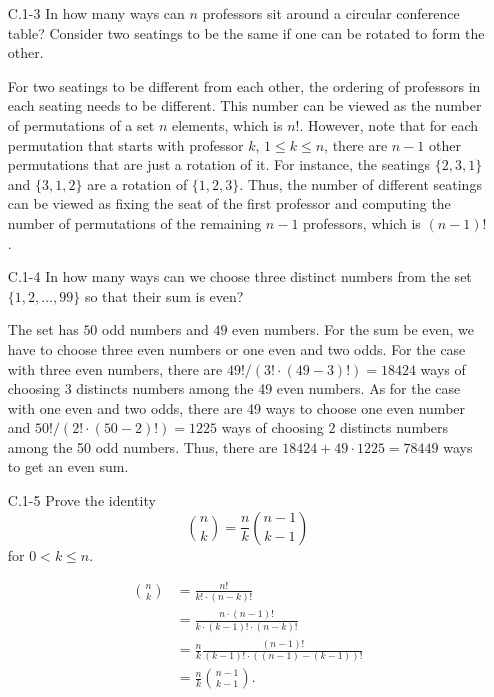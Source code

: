 \documentclass{report}
\makeatletter
\renewenvironment{framed}{%
 \def\FrameCommand##1{\hskip\@totalleftmargin
 \fboxsep=\FrameSep\fbox{##1}}%
 \MakeFramed {\advance\hsize-\width
   \@totalleftmargin\z@ \linewidth\hsize
   \@setminipage}}%
 {\par\unskip\endMakeFramed}
\makeatother
\begin{document}
\begin{enumerate}
\item[C.1{-}3] {In how many ways can $n$ professors sit around a circular
conference table? Consider two seatings to be the same if one can be rotated to
form the other.}

\begin{framed}
For two seatings to be different from each other, the ordering of professors in
each seating needs to be different. This number can be viewed as the number
of permutations of a set $n$ elements, which is $n!$. However, note that for
each permutation that starts with professor $k$, $1 \le k \le n$, there are
$n - 1$ other permutations that are just a rotation of it. For instance, the
seatings $\{2, 3, 1\}$ and $\{3, 1, 2\}$ are a rotation of $\{1, 2, 3\}$. Thus,
the number of different seatings can be viewed as fixing the seat of the first
professor and computing the number of permutations of the remaining $n - 1$
professors, which is $(n - 1)!$.
\end{framed}

\item[C.1{-}4] {In how many ways can we choose three distinct numbers from the
set $\{1, 2, \dots, 99\}$ so that their sum is even?}

\begin{framed}
The set has $50$ odd numbers and $49$ even numbers. For the sum be even, we have
to choose three even numbers or one even and two odds. For the case with three
even numbers, there are $49!/(3! \cdot (49 - 3)!) = 18424$ ways of choosing $3$
distincts numbers among the 49 even numbers. As for the case with one even and
two odds, there are 49 ways to choose one even number and
$50!/(2! \cdot (50 - 2)!) = 1225$ ways of choosing $2$ distincts numbers among the
50 odd numbers. Thus, there are $18424 + 49 \cdot 1225 = 78449$ ways to get an
even sum.
\end{framed}

\newpage

\item[C.1{-}5] {Prove the identity
\[
  \binom{n}{k} = \frac{n}{k} \binom{n - 1}{k - 1}
\]
for $0 < k \le n$.
}

\begin{framed}
\begin{equation*}
\begin{aligned}
  \binom{n}{k} &= \frac{n!}{k! \cdot (n - k)!}\\
               &= \frac{n \cdot (n - 1)!}{k \cdot (k - 1)! \cdot (n - k)!}\\
               &= \frac{n}{k} \frac{(n - 1)!}{(k - 1)! \cdot ((n - 1) - (k - 1))!}\\
               &= \frac{n}{k} \binom{n - 1}{k - 1}.
\end{aligned}
\end{equation*}
\end{framed}


\end{enumerate}
\end{document}
